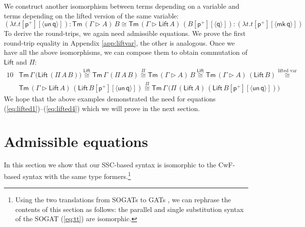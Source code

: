 \documentclass[a4paper,UKenglish]{article}
\newcommand{\Tm}{\mathsf{Tm}}
\newcommand{\p}{\mathsf{p}}
\newcommand{\q}{\mathsf{q}}
\newcommand{\ext}{\mathop{\triangleright}}
\newcommand{\Lift}{\mathsf{Lift}}
\newcommand{\mk}{\mathsf{mk}}
\newcommand{\un}{\mathsf{un}}
\begin{document}
We construct another isomorphism between terms depending on a variable and
terms depending on the lifted version of the same variable:
\begin{equation}\label{eq:liftvar}
(\lambda t.t[\p^+][\langle\un\,\q\rangle]) : \Tm\,(\Gamma\ext A)\,B \cong \Tm\,(\Gamma\ext\Lift\,A)\,(B[\p^+][\langle\q\rangle]) : (\lambda t.t[\p^+][\langle\mk\,\q\rangle])
\end{equation}
To derive the round-trips, we again need admissible equations. We prove
the first round-trip equality in Appendix \ref{app:liftvar}, the other
is analogous.
Once we have all the above isomorphisms, we can compose them to obtain commutation of $\Lift$ and $\Pi$:
\begin{alignat*}{10}
  & \Tm\,\Gamma\,\big(\Lift\,(\Pi\,A\,B)\big) \overset{\text{$\Lift$}}{\cong}
  \Tm\,\Gamma\,(\Pi\,A\,B) \overset{\text{$\Pi$}}{\cong} 
  \Tm\,(\Gamma\ext A)\,B \overset{\text{$\Lift$}}{\cong} 
  \Tm\,(\Gamma\ext A)\,(\Lift\,B) \overset{\text{lifted var}}{\cong} \\
  & \Tm\,(\Gamma\ext \Lift\,A)\,(\Lift\,B[\p^+][\langle\un\,\q\rangle]) \overset{\text{$\Pi$}}{\cong}
  \Tm\,\Gamma\,\big(\Pi\,(\Lift\,A)\,(\Lift\,B[\p^+][\langle\un\,\q\rangle])\big)
\end{alignat*}
We hope that the above examples demonstrated the need for equations
(\ref{eq:lifted1})--(\ref{eq:lifted4}) which we will prove in the next
section.

% 


\section{Admissible equations}
\label{sec:admissible}

In this section we show that our SSC-based syntax is isomorphic to the
CwF-based syntax with the same type formers.\footnote{Using the two translations from SOGATs to GATs
\cite{DBLP:conf/fscd/KaposiX24}, we can rephrase the contents of this
section as follows: the parallel and single substitution syntax of the SOGAT (\ref{eq:tt}) are
isomorphic.}
\end{document}

